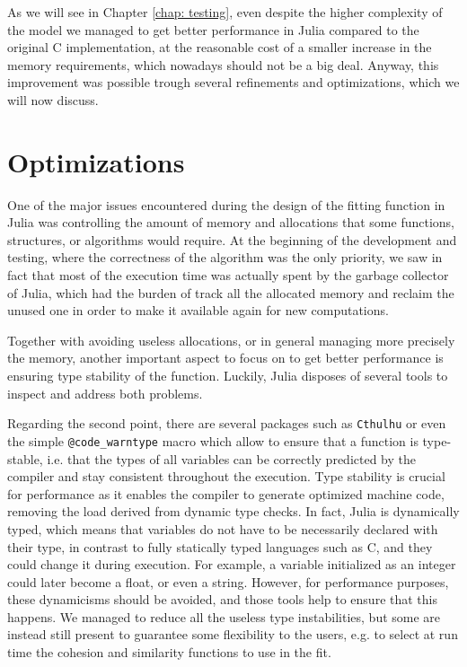\documentclass[12pt,	%
	a4paper,		%
	twoside,		%
	openright,		%
	titlepage,%
	]{book}
\theoremstyle{definition}
\newcommand{\mjline}[1]{\texttt{#1}}
\begin{document}

As we will see in Chapter \ref{chap: testing}, even despite the higher complexity of the model we managed to get better performance in Julia compared to the original C implementation, at the reasonable cost of a smaller increase in the memory requirements, which nowadays should not be a big deal. Anyway, this improvement was possible trough several refinements and optimizations, which we will now discuss.

\section{Optimizations}

One of the major issues encountered during the design of the fitting function in Julia was controlling the amount of memory and allocations that some functions, structures, or algorithms would require. At the beginning of the development and testing, where the correctness of the algorithm was the only priority, we saw in fact that most of the execution time was actually spent by the garbage collector of Julia, which had the burden of track all the allocated memory and reclaim the unused one in order to make it available again for new computations. 

Together with avoiding useless allocations, or in general managing more precisely the memory, another important aspect to focus on to get better performance is ensuring type stability of the function. Luckily, Julia disposes of several tools to inspect and address both problems. 

Regarding the second point, there are several packages such as \mjline{Cthulhu} or even the simple \mjline{@code_warntype} macro which allow to ensure that a function is type-stable, i.e. that the types of all variables can be correctly predicted by the compiler and stay consistent throughout the execution. Type stability is crucial for performance as it enables the compiler to generate optimized machine code, removing the load derived from dynamic type checks. In fact, Julia is dynamically typed, which means that variables do not have to be necessarily declared with their type, in contrast to fully statically typed languages such as C, and they could change it during execution. For example, a variable initialized as an integer could later become a float, or even a string. However, for performance purposes, these dynamicisms should be avoided, and those tools help to ensure that this happens. We managed to reduce all the useless type instabilities, but some are instead still present to guarantee some flexibility to the users, e.g. to select at run time the cohesion and similarity functions to use in the fit.
\end{document}
